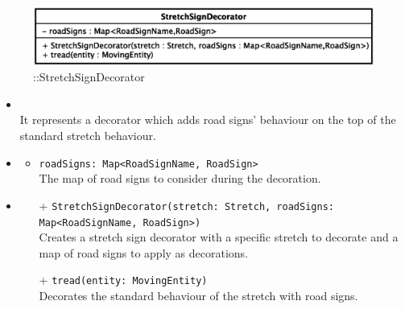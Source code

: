 \begin{figure}[h]
\centering
\includegraphics[scale=0.6,keepaspectratio]{images/solution/app/backend/stretch_sign_decorator.eps}
\caption{\pReactiveComponentStretchDecoration::StretchSignDecorator}
\label{fig:sd-app-stretch_sign_decorator}
\end{figure}
\FloatBarrier
\begin{itemize}
  \item \textbf{\descr} \\
    It represents a decorator which adds road signs' behaviour on the top of the
    standard stretch behaviour. 
  \item \textbf{\attrs}
  \begin{itemize}
    \item \texttt{roadSigns: Map<RoadSignName, RoadSign>} \\
The map of road signs to consider during the decoration.
  \end{itemize}
  \item \textbf{\ops}
   \begin{itemize} 
   \item[+] \texttt{StretchSignDecorator(stretch: Stretch, roadSigns: Map<RoadSignName, RoadSign>)} \\
Creates a stretch sign decorator with a specific stretch to decorate and a map of road signs to apply as decorations.
    \item[+] \texttt{tread(entity: MovingEntity)} \\
Decorates the standard behaviour of the stretch with road signs.  
  \end{itemize}
\end{itemize}

